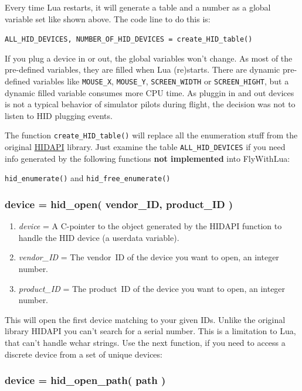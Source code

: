 \documentclass[11pt,parskip=half,a4paper]{scrartcl}
\begin{document}
Every time Lua restarts, it will generate a table and a number as a global variable set like shown above. The code line to do this is:

\verb|ALL_HID_DEVICES, NUMBER_OF_HID_DEVICES = create_HID_table()|


\newpage
If you plug a device in or out, the global variables won't change. As most of the pre-defined variables, they are filled when Lua (re)starts. There are dynamic pre-defined variables like \verb|MOUSE_X|, \verb|MOUSE_Y|, \verb|SCREEN_WIDTH| or \verb|SCREEN_HIGHT|, but a dynamic filled variable consumes more CPU time. As pluggin in and out devices is not a typical behavior of simulator pilots during flight, the decision was not to listen to HID plugging events.

The function \verb|create_HID_table()| will replace all the enumeration stuff from the original 
\href{http://www.signal11.us/oss/hidapi/}{HIDAPI} library. Just examine the table \verb|ALL_HID_DEVICES| if you need info generated by the following functions \textbf{not implemented} into FlyWithLua:

\verb|hid_enumerate()| and \verb|hid_free_enumerate()|

\subsubsection{device = hid\_open( vendor\_ID, product\_ID )}

\begin{enumerate}
\item \emph{device} = A C-pointer to the object generated by the HIDAPI function to handle the HID device (a userdata variable).
\item \emph{vendor\_ID} = The vendor~ID of the device you want to open, an integer number.
\item \emph{product\_ID} = The product~ID of the device you want to open, an integer number.
\end{enumerate}

This will open the first device matching to your given IDs. Unlike the original library HIDAPI you can't search for a serial number. This is a limitation to Lua, that can't handle wchar strings. Use the next function, if you need to access a discrete device from a set of unique devices:

\subsubsection{device = hid\_open\_path( path )}
\end{document}
